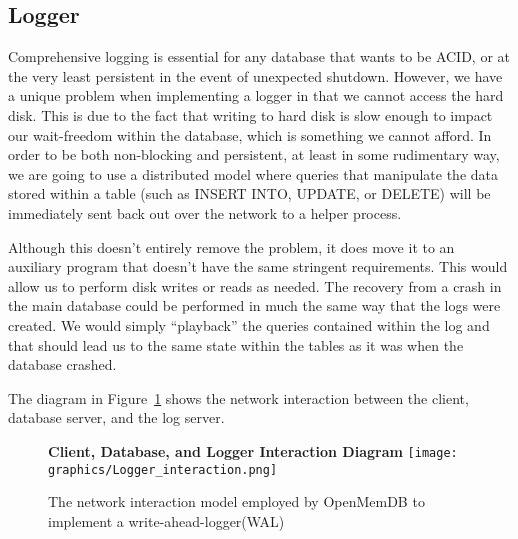 \documentclass[letterpaper, 12pt]{article}
\begin{document}
  \subsection{Logger}
  Comprehensive logging is essential for any database that wants to be ACID, or
  at the very least persistent in the event of unexpected shutdown. However, we
  have a unique problem when implementing a logger in that we cannot access the
  hard disk. This is due to the fact that writing to hard disk is slow enough to
  impact our wait-freedom within the database, which is something we cannot afford.
  In order to be both non-blocking and persistent, at least in some rudimentary way,
  we are going to use a distributed model where queries that manipulate the data
  stored within a table (such as INSERT INTO, UPDATE, or DELETE) will be immediately
  sent back out over the network to a helper process.
  \par\vspace{\baselineskip}
  Although this doesn't entirely remove the problem, it does move it to an auxiliary
  program that doesn't have the same stringent requirements. This would allow us to
  perform disk writes or reads as needed. The recovery from a crash in the main database
  could be performed in much the same way that the logs were created. We would simply
  ``playback'' the queries contained within the log and that should lead us to the same
  state within the tables as it was when the database crashed.
  \par\vspace{\baselineskip}
  The diagram in Figure~\ref{fig:logger_interaction} shows the network interaction between
  the client, database server, and the log server.
  
  \begin{figure}
    \centering
    \textbf{Client, Database, and Logger Interaction Diagram}
    \texttt{[image: graphics/Logger\_interaction.png]}
    \caption{The network interaction model employed by OpenMemDB to implement a
	     write-ahead-logger(WAL)}
    \label{fig:logger_interaction}
  \end{figure}

\newpage
\end{document}
